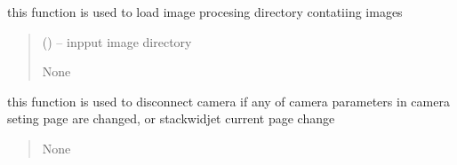 \documentclass[letterpaper,10pt,english]{sphinxmanual}
\begin{document}
\begin{savenotes}
\begin{fulllineitems}
\begin{savenotes}
\begin{fulllineitems}
\end{fulllineitems}\end{savenotes}


\begin{savenotes}\begin{fulllineitems}
\label{\detokenize{setting/setting_api:oxin.setting_api.API.control_list_image}}
\pysigstartsignatures
{}
\pysigstopsignatures
\sphinxAtStartPar
this function is used to load image procesing directory contatiing images
\begin{quote}\begin{description}
\sphinxAtStartPar
{} () – inpput image directory

\sphinxAtStartPar
None

\end{description}\end{quote}

\end{fulllineitems}\end{savenotes}


\begin{savenotes}\begin{fulllineitems}
\label{\detokenize{setting/setting_api:oxin.setting_api.API.disconnect_camera_on_ui_change}}
\pysigstartsignatures
{}
\pysigstopsignatures
\sphinxAtStartPar
this function is used to disconnect camera if any of camera parameters in camera seting page are changed, or stackwidjet current page change
\begin{quote}\begin{description}
\sphinxAtStartPar
None

\end{description}\end{quote}


\end{fulllineitems}
\end{savenotes}
\end{fulllineitems}
\end{savenotes}
\end{document}
